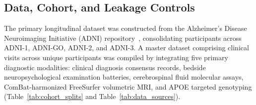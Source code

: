 \subsection{Data, Cohort, and Leakage Controls}
The primary longitudinal dataset was constructed from the Alzheimer's Disease Neuroimaging Initiative (ADNI) repository~\cite{petersen2010adni}, consolidating participants across ADNI-1, ADNI-GO, ADNI-2, and ADNI-3. A master dataset comprising \TotalRows{} clinical visits across \TotalSubjects{} unique participants was compiled by integrating five primary diagnostic modalities: clinical diagnosis consensus records, bedside neuropsychological examination batteries, cerebrospinal fluid molecular assays, ComBat-harmonized FreeSurfer volumetric MRI, and APOE targeted genotyping (Table~\ref{tab:cohort_splits} and Table~\ref{tab:data_sources}).




